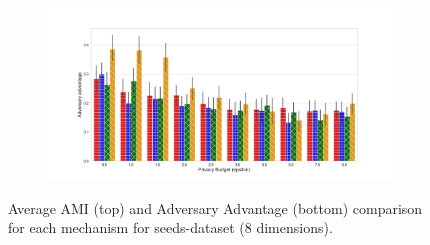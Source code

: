 {\begin{figure}[H]
\begin{subfigure}{1\textwidth}
  \end{subfigure}
  \begin{subfigure}{1\textwidth}
    \includegraphics[width=1\textwidth]{Results/nd-laplace/shokri_mi_adv_seeds-dataset_comparison.png}
  \end{subfigure}
  \caption{Average AMI (top) and Adversary Advantage (bottom) comparison for each mechanism for seeds-dataset (8 dimensions).}
  \label{fig:utility_seeds-dataset_comparison_nd_plot}
\end{figure}
\newpage


}
